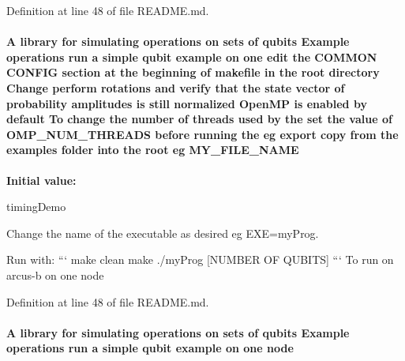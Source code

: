 Definition at line 48 of file README.md.\hypertarget{README_8md_a6c38bfee9462d167a5dd9e634940a8ba}{
\paragraph[{MY\_\-FILE\_\-NAME}]{\setlength{\rightskip}{0pt plus 5cm}A library for simulating operations on sets of qubits Example operations run a simple qubit example on one edit the COMMON CONFIG section at the beginning of makefile in the root directory Change perform {\bf rotations} and verify that the state vector of probability amplitudes {\bf is} still normalized OpenMP {\bf is} enabled by default To change the number of threads used by the set the value of {\bf OMP\_\-NUM\_\-THREADS} before running the {\bf eg} export copy from the examples {\bf folder} into the root {\bf eg} {\bf MY\_\-FILE\_\-NAME}}\hfill}
\label{README_8md_a6c38bfee9462d167a5dd9e634940a8ba}
{\bfseries Initial value:}
\begin{DoxyCode}
timingDemo 

Change the name of the executable as desired eg EXE=myProg.

Run with:
```
make clean
make
./myProg [NUMBER OF QUBITS] 
```
To run on arcus-b on one node
\end{DoxyCode}


Definition at line 48 of file README.md.\hypertarget{README_8md_a76fcdcc459e3177b276f62e5e4f9f987}{
\paragraph[{node}]{\setlength{\rightskip}{0pt plus 5cm}A library for simulating operations on sets of qubits Example operations run a simple qubit example on one {\bf node}}\hfill}
\label{README_8md_a76fcdcc459e3177b276f62e5e4f9f987}


